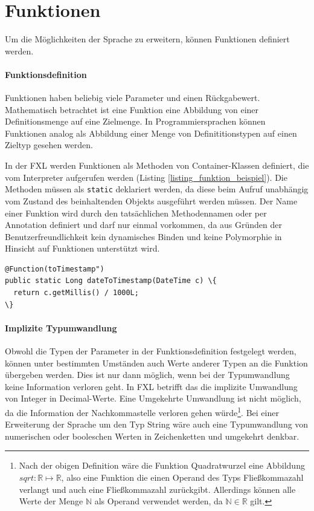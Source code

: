 \section{Funktionen}
\label{section_design_funktionen}

Um die Möglichkeiten der Sprache zu erweitern, können Funktionen definiert werden. 

\paragraph{Funktionsdefinition}Funktionen haben beliebig viele Parameter und einen Rückgabewert. Mathematisch betrachtet ist eine Funktion eine Abbildung von einer Definitionsmenge auf eine Zielmenge. In Programmiersprachen können Funktionen analog als Abbildung einer Menge von Definititionstypen auf einen Zieltyp gesehen werden.

In der FXL werden Funktionen als Methoden von Container-Klassen definiert, die vom Interpreter aufgerufen werden (Listing \ref{listing_funktion_beispiel}). Die Methoden müssen als \texttt{static} deklariert werden, da diese beim Aufruf unabhängig vom Zustand des beinhaltenden Objekts ausgeführt werden müssen. Der  Name einer Funktion wird durch den tatsächlichen Methodennamen oder per Annotation definiert und darf nur einmal vorkommen, da aus Gründen der Benutzerfreundlichkeit kein dynamisches Binden und keine Polymorphie in Hinsicht auf Funktionen unterstützt wird.

\begin{lstlisting}[float = htbp,caption={Beispiel einer Funktionsimplementierung},label=listing_funktion_beispiel]
@Function(toTimestamp")
public static Long dateToTimestamp(DateTime c) \{
  return c.getMillis() / 1000L;
\}
\end{lstlisting}




\paragraph{Implizite Typumwandlung} Obwohl die Typen der Parameter in der Funktionsdefinition festgelegt werden, können unter bestimmten Umständen auch Werte anderer Typen an die Funktion übergeben werden. Dies ist nur dann möglich, wenn bei der Typumwandlung keine Information verloren geht. In FXL betrifft das die implizite Umwandlung von Integer in Decimal-Werte. Eine Umgekehrte Umwandlung ist nicht möglich, da die Information der Nachkommastelle verloren gehen würde\footnote{Nach der obigen Definition wäre die Funktion Quadratwurzel eine Abbildung $ sqrt: \mathbb{R} \mapsto \mathbb{R} $, also eine Funktion die einen Operand des Typs Fließkommazahl verlangt und auch eine Fließkommazahl zurückgibt.  Allerdings können alle Werte der Menge $ \mathbb{N} $ als Operand verwendet werden, da  $\mathbb{N} \in \mathbb{R} $ gilt.}.
Bei einer Erweiterung der Sprache um den Typ String wäre auch eine Typumwandlung von numerischen oder booleschen Werten in Zeichenketten und umgekehrt denkbar.


